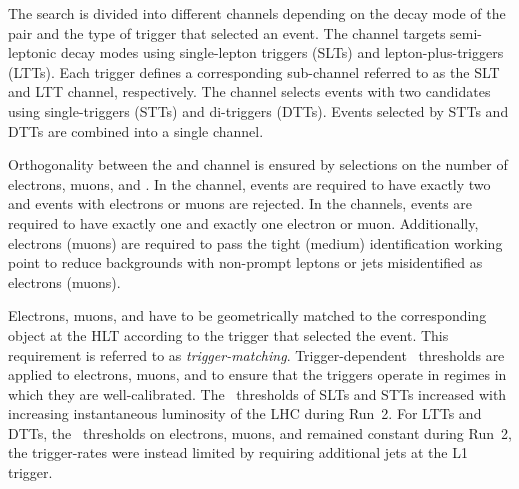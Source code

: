 The search is divided into different channels depending on the decay mode of the
\taulepton pair and the type of trigger that selected an event. The \lephad
channel targets semi-leptonic decay modes using single-lepton triggers (SLTs)
and lepton-plus-\tauhadvis triggers (LTTs). Each trigger defines a corresponding
sub-channel referred to as the \lephad SLT and \lephad LTT channel,
respectively. The \hadhad channel selects events with two \tauhadvis candidates
using single-\tauhadvis triggers (STTs) and di-\tauhadvis triggers (DTTs).
Events selected by STTs and DTTs are combined into a single channel.


Orthogonality between the \lephad and \hadhad channel is ensured by selections
on the number of electrons, muons, and \tauhadvis. In the \hadhad channel,
events are required to have exactly two \tauhadvis and events with electrons or
muons are rejected. In the \lephad channels, events are required to have exactly
one \tauhadvis and exactly one electron or muon. Additionally, electrons (muons)
are required to pass the tight (medium) identification working point to reduce
backgrounds with non-prompt leptons or jets misidentified as electrons (muons).

Electrons, muons, and \tauhadvis have to be geometrically matched to the
corresponding object at the HLT according to the trigger that selected the
event. This requirement is referred to as
\emph{trigger-matching}. Trigger-dependent \pT~thresholds are applied to
electrons, muons, and \tauhadvis to ensure that the triggers operate in regimes
in which they are well-calibrated. The \pT~thresholds of SLTs and STTs increased
with increasing instantaneous luminosity of the LHC during Run~2. For LTTs and
DTTs, the \pT~thresholds on electrons, muons, and \tauhadvis remained constant
during Run~2, the trigger-rates were instead limited by requiring additional
jets at the L1 trigger.


